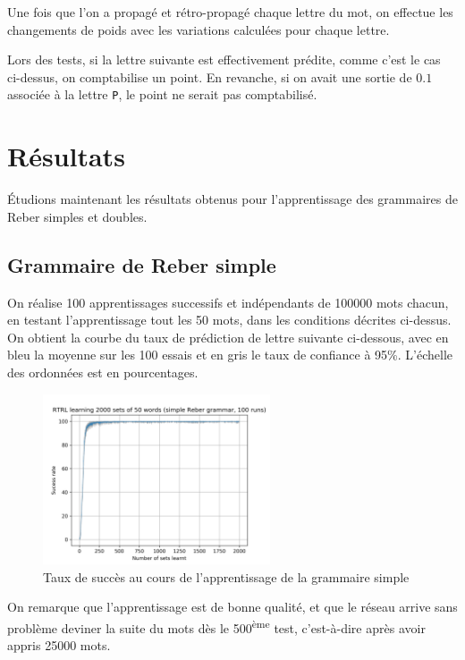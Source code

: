 Une fois que l'on a propagé et rétro-propagé chaque lettre du mot, on effectue les changements de poids avec les variations calculées pour chaque lettre.

Lors des tests, si la lettre suivante est effectivement prédite, comme c'est le cas ci-dessus, on comptabilise un point. En revanche, si on avait une sortie de $0.1$ associée à la lettre \verb+P+, le point ne serait pas comptabilisé.

\section{Résultats}
Étudions maintenant les résultats obtenus pour l'apprentissage des grammaires de Reber simples et doubles.

\subsection{Grammaire de Reber simple}
On réalise 100 apprentissages successifs et indépendants de 100000 mots chacun, en testant l'apprentissage tout les 50 mots, dans les conditions décrites ci-dessus. On obtient la courbe du taux de prédiction de lettre suivante ci-dessous, avec en bleu la moyenne sur les 100 essais et en gris le taux de confiance à 95\%. L'échelle des ordonnées est en pourcentages.

\begin{figure}[!ht]
\begin{center}
\includegraphics[width=0.6\textwidth]{images/SimpleRTRL-r1.png}
\end{center}
\caption{Taux de succès au cours de l'apprentissage de la grammaire simple}
\end{figure}

On remarque que l'apprentissage est de bonne qualité, et que le réseau arrive sans problème deviner la suite du mots dès le 500\textsuperscript{ème} test, c'est-à-dire après avoir appris 25000 mots.

